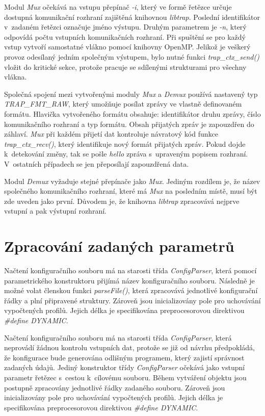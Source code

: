  Modul \textit{Mux} očekává na vstupu přepínač \textit{-i}, který ve formě řetězce určuje dostupná 
 komunikační rozhraní 
 zajištěná knihovnou \textit{libtrap}. Poslední identifikátor v~zadaném řetězci označuje jméno 
 výstupu. Druhým parametrem je \textit{-n}, který odpovídá počtu vstupních komunikačních
 rozhraní. Při spuštění 
 se pro každý vstup vytvoří samostatné vlákno pomocí knihovny OpenMP. Jelikož je veškerý provoz 
 odesílaný jedním společným výstupem, bylo nutné funkci \textit{trap\_ctx\_send()} vložit do
 kritické sekce, 
 protože pracuje se sdílenými strukturami pro všechny vlákna.
 
 Společná spojení mezi vytvořenými moduly \textit{Mux} a \textit{Demux} používá nastavený typ
 \textit{TRAP\_FMT\_RAW},
 který umožňuje posílat zprávy ve vlastně definovaném formátu. Hlavička vytvořeného formátu
 obsahuje: identifikátor druhu zprávy, číslo komunikačního rozhraní a typ formátu. Obsah přijatých zpráv
 je zapouzdřen do záhlaví. \textit{Mux} při každém přijetí dat kontroluje návratový
 kód funkce \textit{trap\_ctx\_recv()}, který identifikuje nový formát přijatých zpráv. Pokud
 dojde k~detekování změny, tak se pošle \textit{hello} zpráva s~upraveným popisem rozhraní.
 V~ostatních případech se jen přeposílají zapouzdřená data.
 
 Modul \textit{Demux} vyžaduje stejné přepínače jako \textit{Mux}. Jediným rozdílem je, že 
 název společného komunikačního rozhraní, které má \textit{Mux} na posledním místě, musí být zde uveden 
 jako první. Důvodem je, že knihovna \textit{libtrap} zpracovává nejprve vstupní a pak
 výstupní rozhraní. 
 
\section{Zpracování zadaných parametrů}

Načtení konfiguračního souboru má na starosti třída \textit{ConfigParser}, která pomocí parametrického
konstruktoru přijímá název konfiguračního souboru. Následně je možné volat členskou funkci
\textit{parseFile()}, která zpracovává jednotlivé konfigurační řádky a plní připravené struktury.
Zároveň jsou inicializovány pole pro uchovávání vypočtených profilů.
Jejich délka je specifikována preprocesorovou direktivou \textit{\#define DYNAMIC}.

Načtení konfiguračního souboru má na starosti třída \textit{ConfigParser}, která neprovádí 
žádnou kontrolu vstupních dat, protože se již od návrhu předpokládá, že konfigurace bude 
generována odlišným programem, který zajistí správnost zadaných údajů. Jediný konstruktor třídy
 \textit{ConfigParser} očekává jako vstupní parametr řetězec s~cestou k~cílovému souboru. Během vytváření
 objektu jsou postupně zpracovány jednotlivé řádky zadaného souboru. Zároveň jsou inicializovány
 pole pro uchovávání vypočtených profilů. Jejich délka je specifikována preprocesorovou direktivou
 \textit{\#define DYNAMIC}.
 
